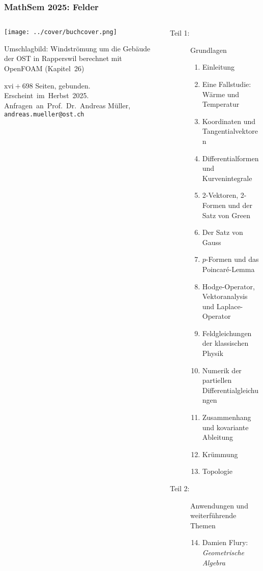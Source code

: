 \documentclass[handout]{beamer}
\title[]{}
\begin{document}
\begin{frame}
\frametitle{%
MathSem 2025: Felder}
\vspace*{-0.1cm}
\begin{columns}[t,onlytextwidth]
\begin{column}{0.37\textwidth}
\begin{center}
\texttt{[image: ../cover/buchcover.png]}
\end{center}
\bigskip
Umschlagbild: Windströmung um die Gebäude der OST in Rapperswil
berechnet mit OpenFOAM (Kapitel~26)
\bigskip
\bigskip

$\text{xvi} + 698$ Seiten, gebunden.
Erscheint~im~Herbst~2025.\\
Anfragen~an~Prof.~Dr.~Andreas Müller,\\
{\texttt{andreas.mueller@ost.ch}}
\bigskip
\bigskip
\bigskip
\end{column}
%
\begin{column}{0.60\textwidth}
\begin{description}
\item[Teil 1:] Grundlagen
\begin{enumerate}
\item Einleitung
\item Eine Fallstudie: Wärme und Temperatur
\item Koordinaten und Tangentialvektoren
\item Differentialformen und Kurvenintegrale
\item 2-Vektoren, 2-Formen und der Satz von Green
\item Der Satz von Gauss
\item $p$-Formen und das Poincaré-Lemma
\item Hodge-Operator, Vektoranalysis und Laplace-Operator
\item Feldgleichungen der klassischen Physik
\item Numerik der partiellen Differentialgleichungen
\item Zusammenhang und kovariante Ableitung
\item Krümmung
\item Topologie
\end{enumerate}
\item[Teil 2:] Anwendungen und weiterführende Themen
\begin{enumerate}
\setcounter{enumi}{13}
\item Damien Flury: {\em Geometrische Algebra}

\end{enumerate}
\end{description}
\end{column}
\end{columns}
\end{frame}
\end{document}
